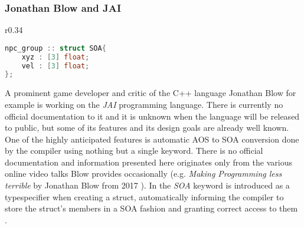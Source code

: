 \subsubsection{Jonathan Blow and JAI}
\begin{wrapfigure}[6]{r}{0.34\textwidth}
\vspace{-0.8cm}
\begin{lstlisting}[language=C++,name={JAI's native SOA support},morekeywords={SOA}, label={jai_npc}]
npc_group :: struct SOA{
	xyz : [3] float;
	vel : [3] float;
};
\end{lstlisting}
\end{wrapfigure}
A prominent game developer and critic of the C++ language Jonathan Blow for example is working on the \textit{JAI} programming language. There is currently no official documentation to it and it is unknown when the language will be released to public, but some of its features and its design goals are already well known. One of the highly anticipated features is automatic AOS to SOA conversion done by the compiler using nothing but a single keyword. There is no official documentation and information presented here originates only from the various online video talks Blow provides occasionally (e.g. \textit{Making Programming less terrible} by Jonathan Blow from 2017 ). In  the \textit{SOA} keyword is introduced as a typespecifier when creating a struct, automatically informing the compiler to store the struct's members in a SOA fashion and granting correct access to them .

